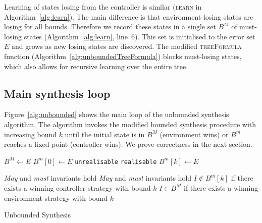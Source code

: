 \documentclass{llncs}
\newcommand{\textoverline}[1]{$\overline{\mbox{#1}}$}
\begin{document}
Learning of states losing from the controller is similar (\textsc{learn} in
Algorithm~\ref{alg:learn}). The main difference is that environment-losing
states are losing for all bounds. Therefore we record these states in a single
set $B^M$ of must-losing states (Algorithm~\ref{alg:learn}, line~6).  This set
is initialised to the error set $E$ and grows as new losing states are
discovered.  The modified \textsc{\textoverline{treeFormula}} function
(Algorithm~\ref{alg:unboundedTreeFormula}) blocks must-losing states, which
also allows for recursive learning over the entire tree.

\subsection{Main synthesis loop}

Figure~\ref{alg:unbounded} shows the main loop of the unbounded synthesis algorithm.
The algorithm invokes the modified bounded synthesis procedure with increasing bound $k$
until the initial state is in $B^M$ (environment wins) or $B^m$ reaches a fixed point 
(controller wins). We prove correctness in the next section.

\begin{algorithm}[h]
    \begin{algorithmic}[1]
            \State $B^M \gets E$
            \State $B^m[0] \gets E$
                    \Return \texttt{unrealisable} 
                \EndIIf
                 
                    \State \hspace{\algorithmicindent} \Return \texttt{realisable} 
                \EndIIf
                \State $B^m[k] \gets E$
                \State {}
            \EndFor
        \EndFunction
    \end{algorithmic}

    \begin{algorithmic}
        \Require \emph{May} and \emph{must} invariants hold
        \Ensure \emph{May} and \emph{must} invariants hold
        \Ensure $I \not\in B^m[k]$ if there exists a winning controller strategy with bound $k$
        \Ensure $I \in B^M$ if there exists a winning environment strategy with bound $k$
            \State \Return {}
        \EndFunction
    \end{algorithmic}
    \caption{Unbounded Synthesis}
    \label{alg:unbounded}
\end{algorithm}
\end{document}
